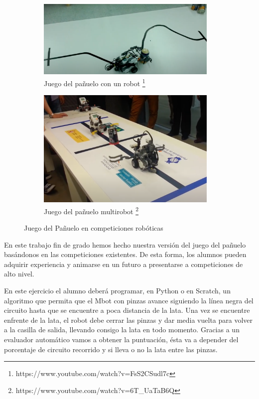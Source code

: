 \begin{figure}[H]
  \begin{subfigure}[b]{0.5\textwidth}
  \centering
    \includegraphics[width=0.95\textwidth, height=0.5\textwidth]{chapters/images/jp.png}
    \caption{Juego del pañuelo con un robot \footnote{https://www.youtube.com/watch?v=FsS2CSudl7c}}
    \label{fig:f1}
  \end{subfigure}
  \hfill
  \begin{subfigure}[b]{0.5\textwidth}
  \centering
    \includegraphics[width=0.95\textwidth, height=0.5\textwidth]{chapters/images/jp2.png}
    \caption{Juego del pañuelo multirobot \footnote{https://www.youtube.com/watch?v=6T\_Ua\-TaB6Q}}
    \label{fig:f2}
  \end{subfigure}
  \caption{Juego del Pañuelo en competiciones robóticas}

\end{figure}

En este trabajo fin de grado hemos hecho nuestra versión del juego del pañuelo basándonos en las competiciones existentes. De esta forma, los alumnos pueden adquirir experiencia y animarse en un futuro a presentarse a competiciones de alto nivel.
 
En este ejercicio el alumno deberá programar, en Python o en Scratch, un algoritmo que permita que el Mbot con pinzas avance siguiendo la línea negra del circuito hasta que se encuentre a poca distancia de la lata. Una vez se encuentre enfrente de la lata, el robot debe cerrar las pinzas y dar media vuelta para volver a la casilla de salida, llevando consigo la lata en todo momento. Gracias a un evaluador automático vamos a obtener la puntuación, ésta va a depender del porcentaje de circuito recorrido y si lleva o no la lata entre las pinzas.


